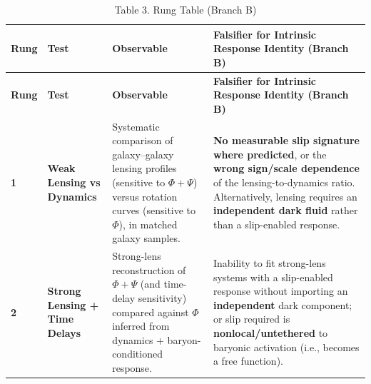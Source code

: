 \begin{longtable}[]{@{}
  >{\centering\arraybackslash}p{}
  >{\raggedright\arraybackslash}p{}
  >{\raggedright\arraybackslash}p{}
  >{\raggedright\arraybackslash}p{}@{}}
\caption{\protect{}\label{_Toc222952633}{}Table 3. Rung Table (Branch B)}\tabularnewline
\toprule\noalign{}
\begin{minipage}[b]{\linewidth}\centering
\textbf{Rung}
\end{minipage} & \begin{minipage}[b]{\linewidth}\centering
\textbf{Test}
\end{minipage} & \begin{minipage}[b]{\linewidth}\centering
\textbf{Observable}
\end{minipage} & \begin{minipage}[b]{\linewidth}\centering
\textbf{Falsifier for Intrinsic Response Identity (Branch B)}
\end{minipage} \\
\midrule\noalign{}
\endfirsthead
\toprule\noalign{}
\begin{minipage}[b]{\linewidth}\centering
\textbf{Rung}
\end{minipage} & \begin{minipage}[b]{\linewidth}\centering
\textbf{Test}
\end{minipage} & \begin{minipage}[b]{\linewidth}\centering
\textbf{Observable}
\end{minipage} & \begin{minipage}[b]{\linewidth}\centering
\textbf{Falsifier for Intrinsic Response Identity (Branch B)}
\end{minipage} \\
\midrule\noalign{}
\endhead
\bottomrule\noalign{}
\endlastfoot
\textbf{1} & \textbf{Weak Lensing vs Dynamics} & Systematic comparison of galaxy--galaxy lensing profiles (sensitive to \(\Phi + \Psi\)) versus rotation curves (sensitive to \(\Phi\)), in matched galaxy samples. & \textbf{No measurable slip signature where predicted}, or the \textbf{wrong sign/scale dependence} of the lensing-to-dynamics ratio. Alternatively, lensing requires an \textbf{independent dark fluid} rather than a slip-enabled response. \\
\textbf{2} & \textbf{Strong Lensing + Time Delays} & Strong-lens reconstruction of \(\Phi + \Psi\) (and time-delay sensitivity) compared against \(\Phi\) inferred from dynamics + baryon-conditioned response. & Inability to fit strong-lens systems with a slip-enabled response without importing an \textbf{independent} dark component; or slip required is \textbf{nonlocal/untethered} to baryonic activation (i.e., becomes a free function). \\

\end{longtable}
